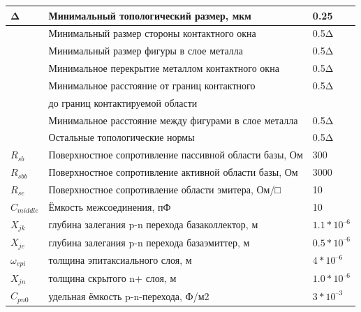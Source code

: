 \documentclass[a4paper,14pt]{article}
\begin{document}
\begin{table}[H]	
	\begin{center}
	\begin{flushleft}
	\end{flushleft}
	\begin{tabular}{|l|l|l|}

		\hline
		Δ        & Минимальный топологический размер, мкм                                               & 0.25     \\ \hline
		& Минимальный размер стороны контактного окна                                          & 0.5Δ     \\ \hline
		& Минимальный размер фигуры в слое металла                                             & 0.5Δ     \\ \hline
		& Минимальное перекрытие металлом контактного окна                                     & 0.5Δ     \\ \hline
		& Минимальное расстояние от границ контактного   & 0.5Δ     \\ 
		& до границ контактируемой области   &     \\ \hline
		& Минимальное расстояние между фигурами в слое металла                                 & 0.5Δ     \\ \hline
		& Остальные топологические нормы                                                       & 0.5Δ     \\ \hline \hline
		
		$R_{sb}$         & Поверхностное сопротивление пассивной области базы, Ом                      & 300      \\ \hline
		$R_{sbb}$        & Поверхностное сопротивление активной области базы, Ом                       & 3000     \\ \hline
		$R_{se}$         & Поверхностное сопротивление области эмитера, Ом/□                           &     10     \\ \hline
		$C_{middle}$     & Ёмкость межсоединения, пФ                                                   &      10    \\ \hline
		$X_{jk}$         & глубина залегания p-n перехода базаколлектор, м                             & $1.1*10^{–6}$ \\ \hline
		$X_{je}$         & глубина залегания p-n перехода базаэмиттер, м                               & $0.5*10^{–6}$ \\ \hline
		$\omega_{epi}$   & толщина эпитаксиального слоя, м                                             & $4*10^{–6}  $ \\ \hline
		$X_{jn}$         & толщина скрытого n+ слоя, м                                                 & $1.0*10^{–6}$ \\ \hline
		$C_{pn0}$        & удельная ёмкость p-n-перехода, Ф/м2                                         & $3*10^{–3}  $ \\ \hline
		\hline
		

\end{tabular}
\end{center}
\end{table}
\end{document}
